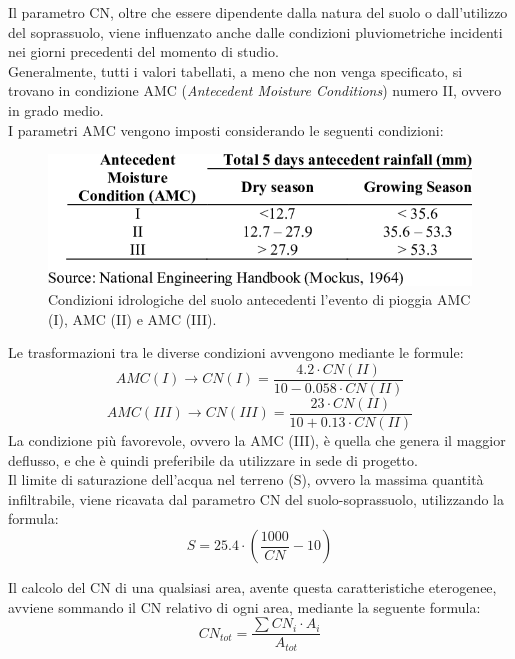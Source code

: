Il parametro CN, oltre che essere dipendente dalla natura del suolo o dall'utilizzo del soprassuolo, viene influenzato anche dalle condizioni pluviometriche incidenti nei giorni precedenti del momento di studio.\\
Generalmente, tutti i valori tabellati, a meno che non venga specificato, si trovano in condizione AMC (\textit{Antecedent Moisture Conditions}) numero II, ovvero in grado medio.\\
I parametri AMC vengono imposti considerando le seguenti condizioni:
\begin{figure}[H]  \centering
    \includegraphics[scale=0.7]{immagini/AMC_table.png}
    \caption{Condizioni idrologiche del suolo antecedenti l'evento di pioggia AMC (I), AMC (II) e AMC (III).}
    \label{AMC_table}
\end{figure}
Le trasformazioni tra le diverse condizioni avvengono mediante le formule:
\begin{equation}
    AMC (I)\rightarrow CN (I) = \frac{4.2 \cdot CN(II)}{10-0.058 \cdot CN(II)}
\end{equation}
\begin{equation}
    AMC(III) \rightarrow CN(III) = \frac{23\cdot CN (II)}{10+0.13 \cdot CN(II)}
    \label{eq:amcIII}
\end{equation}
La condizione più favorevole, ovvero la AMC (III), è quella che genera il maggior deflusso, e che è quindi preferibile da utilizzare in sede di progetto.\\
Il limite di saturazione dell'acqua nel terreno (S), ovvero la massima quantità infiltrabile, viene ricavata dal parametro CN del suolo-soprassuolo, utilizzando la formula:
\begin{equation}
    S = 25.4 \cdot \left(\frac{1000}{CN} -10 \right)
    \label{eq:parametro_S}
\end{equation} 

Il calcolo del CN di una qualsiasi area, avente questa caratteristiche eterogenee, avviene sommando il CN relativo di ogni area, mediante la seguente formula:
\begin{equation}
    CN_{tot}=\frac{\sum CN_i \cdot A_i}{A_{tot}}
\end{equation}

